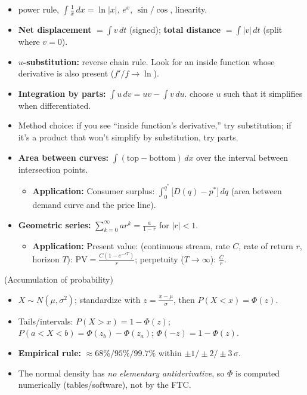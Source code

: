 \documentclass[11pt]{article}
\newcommand{\strand}[1]{%
  \vspace{0.8em}%
  \noindent{\large\textbf{\textcolor{secblue}{#1}}}\par\vspace{0.2em}%
}
\begin{document}
\strand{2.\quad Antiderivatives, Net Change \& Techniques (Objective 2)}
\begin{itemize}[leftmargin=1.5em, itemsep=1pt]
  \item power rule, $\int \tfrac1x\,dx=\ln|x|$, $e^x$, $\sin/\cos$, linearity.
  \item \textbf{Net displacement} $=\int v\,dt$ (signed); \textbf{total distance} $=\int |v|\,dt$ (split where $v=0$).
  \item \textbf{$u$-substitution:} reverse chain rule. Look for an inside function whose derivative is also present ($f'/f \to \ln$).
  \item \textbf{Integration by parts:} $\int u\,dv = uv - \int v\,du$. choose $u$ such that it simplifies when differentiated.
  \item Method choice: if you see ``inside function's derivative,'' try substitution; if it's a product that won't simplify by substitution, try parts.
\end{itemize}

\strand{3.\quad Area and Geometric Series}
\begin{itemize}[leftmargin=1.5em, itemsep=1pt]
  \item \textbf{Area between curves:} $\int (\text{top}-\text{bottom})\,dx$ over the interval between intersection points.
    \begin{itemize}[itemsep=1pt]
      \item \textbf{Application:} Consumer surplus: $\int_0^{q^*}\bigl[D(q)-p^*\bigr]\,dq$ (area between demand curve and the price line).
    \end{itemize}
  \item \textbf{Geometric series:} $\sum_{k=0}^\infty ar^k = \frac{a}{1-r}$ for $|r|<1$.
    \begin{itemize}[itemsep=1pt]
      \item \textbf{Application:} Present value: (continuous stream, rate $C$, rate of return $r$, horizon $T$): $\text{PV}=\frac{C(1-e^{-rT})}{r}$; perpetuity ($T\to\infty$): $\frac{C}{r}$.
    \end{itemize}
\end{itemize}

\strand{4.\quad The Normal Distribution} (Accumulation of probability)
\begin{itemize}[leftmargin=1.5em, itemsep=1pt]
  \item $X\sim N(\mu,\sigma^2)$; standardize with $z=\frac{x-\mu}{\sigma}$, then $P(X<x)=\Phi(z)$.
  \item Tails/intervals: $P(X>x)=1-\Phi(z)$; \;$P(a<X<b)=\Phi(z_b)-\Phi(z_a)$; \;$\Phi(-z)=1-\Phi(z)$.
  \item \textbf{Empirical rule:} $\approx 68\%/95\%/99.7\%$ within $\pm1/\pm2/\pm3\,\sigma$.
  \item The normal density has \emph{no elementary antiderivative}, so $\Phi$ is computed numerically (tables/software), not by the FTC.
\end{itemize}
\end{document}
